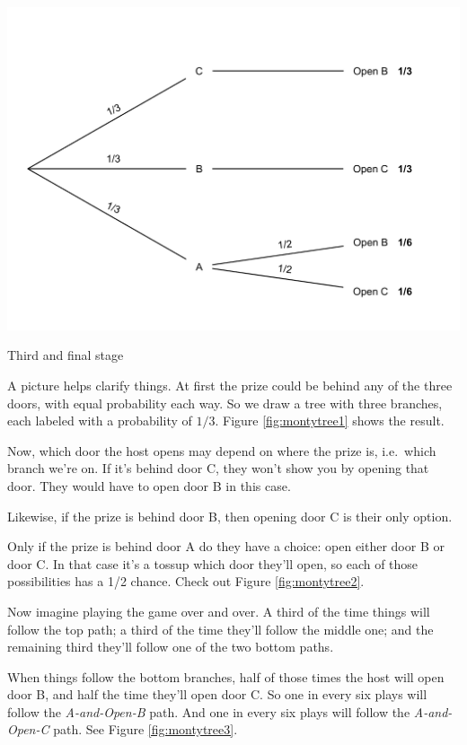 \documentclass[justified]{tufte-book}
\theoremstyle{definition}
\theoremstyle{definition}
\theoremstyle{definition}
\theoremstyle{definition}
\theoremstyle{remark}
\begin{document}
\begin{marginfigure}
\includegraphics{_main_files/figure-latex/montytree3-1} \caption[Third and final stage]{Third and final stage}\label{fig:montytree3}
\end{marginfigure}

A picture helps clarify things. At first the prize could be behind any of the three doors, with equal probability each way. So we draw a tree with three branches, each labeled with a probability of \(1/3\). Figure \ref{fig:montytree1} shows the result.

Now, which door the host opens may depend on where the prize is, i.e.~which branch we're on. If it's behind door C, they won't show you by opening that door. They would have to open door B in this case.

Likewise, if the prize is behind door B, then opening door C is their only option.

Only if the prize is behind door A do they have a choice: open either door B or door C. In that case it's a tossup which door they'll open, so each of those possibilities has a 1/2 chance. Check out Figure \ref{fig:montytree2}.

Now imagine playing the game over and over. A third of the time things will follow the top path; a third of the time they'll follow the middle one; and the remaining third they'll follow one of the two bottom paths.

When things follow the bottom branches, half of those times the host will open door B, and half the time they'll open door C. So one in every six plays will follow the \emph{A-and-Open-B} path. And one in every six plays will follow the \emph{A-and-Open-C} path. See Figure \ref{fig:montytree3}.
\end{document}

